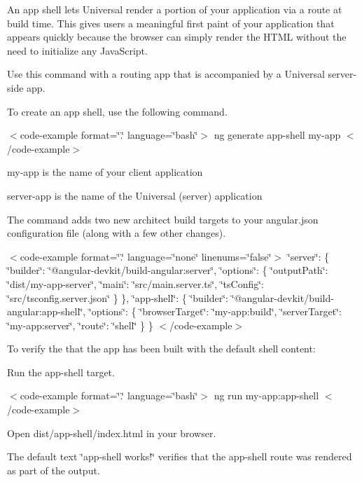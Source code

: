 An app shell lets Universal render a portion of your application via a route at build time. This gives users a meaningful first paint of your application that appears quickly because the browser can simply render the HTML without the need to initialize any Java\+Script.

Use this command with a routing app that is accompanied by a Universal server-\/side app.

To create an app shell, use the following command.

\texorpdfstring{$<$}{<}code-\/example format=\char`\"{}.\char`\"{} language=\char`\"{}bash\char`\"{}\texorpdfstring{$>$}{>} ng generate app-\/shell my-\/app \texorpdfstring{$<$}{<}/code-\/example\texorpdfstring{$>$}{>}


\begin{DoxyItemize}
\item {\ttfamily my-\/app} is the name of your client application
\item {\ttfamily server-\/app} is the name of the Universal (server) application
\end{DoxyItemize}

The command adds two new architect build targets to your {\ttfamily angular.\+json} configuration file (along with a few other changes).

\texorpdfstring{$<$}{<}code-\/example format=\char`\"{}.\char`\"{} language=\char`\"{}none\char`\"{} linenums=\char`\"{}false\char`\"{}\texorpdfstring{$>$}{>} \char`\"{}server\char`\"{}\+: \{ \char`\"{}builder\char`\"{}\+: \char`\"{}@angular-\/devkit/build-\/angular\+:server\char`\"{}, \char`\"{}options\char`\"{}\+: \{ \char`\"{}output\+Path\char`\"{}\+: \char`\"{}dist/my-\/app-\/server\char`\"{}, \char`\"{}main\char`\"{}\+: \char`\"{}src/main.\+server.\+ts\char`\"{}, \char`\"{}ts\+Config\char`\"{}\+: \char`\"{}src/tsconfig.\+server.\+json\char`\"{} \} \}, \char`\"{}app-\/shell\char`\"{}\+: \{ \char`\"{}builder\char`\"{}\+: \char`\"{}@angular-\/devkit/build-\/angular\+:app-\/shell\char`\"{}, \char`\"{}options\char`\"{}\+: \{ \char`\"{}browser\+Target\char`\"{}\+: \char`\"{}my-\/app\+:build\char`\"{}, \char`\"{}server\+Target\char`\"{}\+: \char`\"{}my-\/app\+:server\char`\"{}, \char`\"{}route\char`\"{}\+: \char`\"{}shell\char`\"{} \} \} \texorpdfstring{$<$}{<}/code-\/example\texorpdfstring{$>$}{>}

To verify the that the app has been built with the default shell content\+:


\begin{DoxyEnumerate}
\item Run the app-\/shell target.

\texorpdfstring{$<$}{<}code-\/example format=\char`\"{}.\char`\"{} language=\char`\"{}bash\char`\"{}\texorpdfstring{$>$}{>} ng run my-\/app\+:app-\/shell \texorpdfstring{$<$}{<}/code-\/example\texorpdfstring{$>$}{>}
\end{DoxyEnumerate}
\begin{DoxyEnumerate}
\item Open {\ttfamily dist/app-\/shell/index.\+html} in your browser.
\end{DoxyEnumerate}

The default text \char`\"{}app-\/shell works!\char`\"{} verifies that the app-\/shell route was rendered as part of the output. 